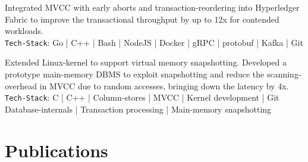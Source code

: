\documentclass[]{deedy-resume-openfont}
\begin{document}
\begin{minipage}[t]{0.67\textwidth}
\sectionsep

Integrated MVCC with early aborts and transaction-reordering into Hyperledger Fabric to improve the transactional throughput by up to 12x for contended workloads.\\
\texttt{Tech-Stack}: Go | C++ | Bash | NodeJS | Docker | gRPC | protobuf | Kafka | Git

\sectionsep

Extended Linux-kernel to support virtual memory snapshotting. Developed a prototype main-memory DBMS to exploit snapshotting and reduce the scanning-overhead in MVCC due to random accesses, bringing down the latency by 4x.\\
\texttt{Tech-Stack}: C | C++ | Column-stores | MVCC | Kernel development | Git Database-internals | Transaction processing | Main-memory snapshotting


\section{Publications} 
\vspace*{0.65cm}
\renewcommand\refname{\vskip -1.5cm} %


\nocite{*}


\end{minipage} 
\end{document}
